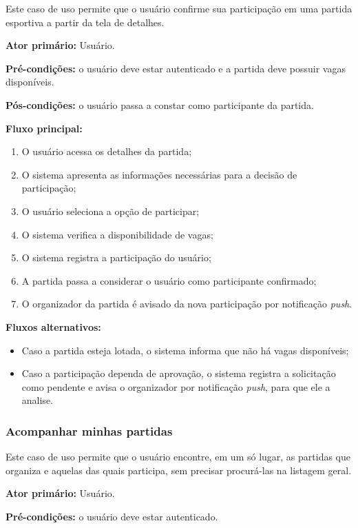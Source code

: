 \documentclass[a4paper, 12pt]{article}
\begin{document}
\begin{justify}
Este caso de uso permite que o usuário confirme sua participação em uma partida esportiva a partir da tela de detalhes.

\textbf{Ator primário:} Usuário.

\textbf{Pré-condições:} o usuário deve estar autenticado e a partida deve possuir vagas disponíveis.

\textbf{Pós-condições:} o usuário passa a constar como participante da partida.

\textbf{Fluxo principal:}

\begin{enumerate}
    \item O usuário acessa os detalhes da partida;
    \item O sistema apresenta as informações necessárias para a decisão de participação;
    \item O usuário seleciona a opção de participar;
    \item O sistema verifica a disponibilidade de vagas;
    \item O sistema registra a participação do usuário;
    \item A partida passa a considerar o usuário como participante confirmado;
    \item O organizador da partida é avisado da nova participação por notificação \textit{push}.
\end{enumerate}

\textbf{Fluxos alternativos:}

\begin{itemize}
    \item Caso a partida esteja lotada, o sistema informa que não há vagas disponíveis;
    \item Caso a participação dependa de aprovação, o sistema registra a solicitação como pendente e avisa o organizador por notificação \textit{push}, para que ele a analise.
\end{itemize}

\subsubsection{Acompanhar minhas partidas}

Este caso de uso permite que o usuário encontre, em um só lugar, as partidas que organiza e aquelas das quais participa, sem precisar procurá-las na listagem geral.

\textbf{Ator primário:} Usuário.

\textbf{Pré-condições:} o usuário deve estar autenticado.


\end{justify}
\end{document}
